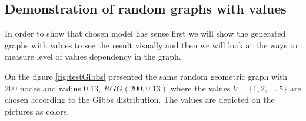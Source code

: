 \documentclass[12pt]{report}
\begin{document}
\subsection{Demonstration of random graphs with values}

In order to show that chosen model has sense first we will show the generated graphs with values to see the result visually and then we will look at the ways to measure level of values dependency in the graph.

On the figure \ref{fig:testGibbs} presented the same random geometric graph with 200 nodes and radius 0.13, $RGG(200, 0.13)$ where the values $V = \lbrace 1, 2, ..., 5 \rbrace$ are chosen according to the Gibbs distribution. The values are depicted on the pictures as colors.
\end{document}
